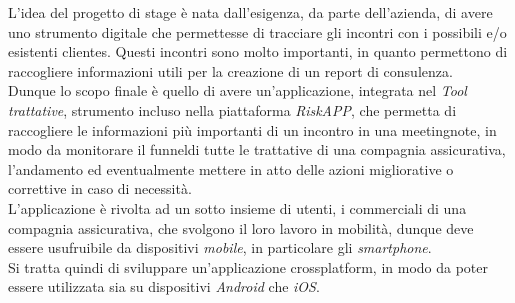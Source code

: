 L'idea del progetto di stage è nata dall'esigenza, da parte dell'azienda, di avere uno strumento digitale che permettesse di tracciare gli incontri con i possibili e/o esistenti \glspl{cliente}\glsoccur.
Questi incontri sono molto importanti, in quanto permettono di raccogliere informazioni utili per la creazione di un report di consulenza.\\
\indent Dunque lo scopo finale è quello di avere un'applicazione, integrata nel \emph{Tool trattative}, strumento incluso nella piattaforma \emph{RiskAPP}, che permetta di raccogliere le informazioni più importanti di un incontro in una \gls{meetingnote}\glsoccur, in modo da monitorare il \gls{funnel}\glsoccur di tutte le trattative di una compagnia assicurativa, l'andamento ed eventualmente mettere in atto delle azioni migliorative o correttive in caso di necessità.\\
\indent L'applicazione è rivolta ad un sotto insieme di utenti, i commerciali di una compagnia assicurativa, che svolgono il loro lavoro in mobilità, dunque deve essere usufruibile da dispositivi \emph{mobile}, in particolare gli \emph{smartphone}.\\
Si tratta quindi di sviluppare un'applicazione \gls{crossplatform}\glsoccur, in modo da poter essere utilizzata sia su dispositivi \emph{Android} che \emph{iOS}.


    
    
    
    
    
